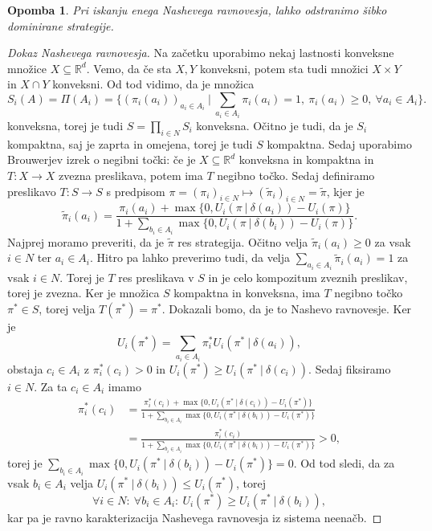 \documentclass[10pt, a4paper]{article}
\newtheorem*{opomba}{Opomba}
\newenvironment{noticeC}{%
  \tcolorbox[%
  notitle,
  empty,
  enhanced,  %
  breakable,
  coltext=black, 
  fontupper=\rmfamily,
  parbox=false,
  noparskip,
  sharp corners,
  boxrule=-1pt,  %
  frame hidden,
  left=7pt,  %
  right=7pt,
  top=5pt,
  bottom=5pt,
  before skip=2.5ex plus 2pt,
  after skip=2.5ex plus 2pt,
  overlay unbroken and last={%
  },
  ]}
{\endtcolorbox}
\newenvironment{dokaz}%
  {\begin{noticeC}\begin{proof}}%
  {\end{proof}\end{noticeC}}
\newcommand{\R}{\mathbb {R}}
\begin{document}
\begin{opomba}
  Pri iskanju enega Nashevega ravnovesja, lahko odstranimo šibko dominirane strategije.
\end{opomba}

\begin{dokaz}[Dokaz Nashevega ravnovesja]
  Na začetku uporabimo nekaj lastnosti konveksne množice $X \subseteq \R^d$.
  Vemo, da če sta $X, Y$ konveksni, potem sta tudi množici $X \times Y$ in $X \cap Y$ konveksni.
  Od tod vidimo, da je množica 
  $$S_i (A) = \Pi(A_i) = \{(\pi_i(a_i))_{a_i \in A_i}\ |\ \sum_{a_i \in A_i} \pi_i (a_i) = 1,\ \pi_i (a_i) \geq 0,\ \forall a_i \in A_i\}.$$
  konveksna, torej je tudi $S = \prod_{i \in N} S_i$ konveksna. 
  Očitno je tudi, da je $S_i$ kompaktna, saj je zaprta in omejena, torej je tudi $S$ kompaktna.
  Sedaj uporabimo Brouwerjev izrek o negibni točki: če je $X \subseteq \R^d$
  konveksna in kompaktna in $T: X \to X$ zvezna preslikava, 
  potem ima $T$ negibno točko.
  Sedaj definiramo preslikavo 
  $T: S \to S$ s predpisom 
  $\pi = (\pi_i)_{i \in N} \mapsto (\widetilde{\pi}_i)_{i\in N} = \widetilde{\pi}$,
  kjer je 
  $$\widetilde{\pi}_i (a_i) = \frac{\pi_i (a_i) + \max \{0, U_i (\pi\ |\ \delta(a_i)) - U_i (\pi)\}}{1 + \sum_{b_i \in A_i} \max \{0, U_i (\pi\ |\ \delta(b_i)) - U_i (\pi)\}}.$$
  Najprej moramo preveriti, da je $\widetilde{\pi}$ res strategija.
  Očitno velja $\widetilde{\pi}_i (a_i) \geq 0$ za vsak $i \in N$ ter $a_i \in A_i$.
  Hitro pa lahko preverimo tudi, da velja $\sum_{a_i \in A_i} \widetilde{\pi}_i (a_i) = 1$ za vsak $i \in N$.
  Torej je $T$ res preslikava v $S$ in je celo kompozitum zveznih preslikav, torej je zvezna.
  Ker je množica $S$ kompaktna in konveksna, ima $T$ negibno točko $\pi^* \in S$, torej velja 
  $T(\pi^*) = \pi^*$. Dokazali bomo, da je to Nashevo ravnovesje.
  Ker je 
  $$U_i (\pi^*) = \sum_{a_i \in A_i} \pi_i^* U_i (\pi^*\ |\ \delta(a_i)),$$
  obstaja $c_i \in A_i$ z $\pi_i^* (c_i) > 0$ in $U_i (\pi^*) \geq U_i (\pi^*\ |\ \delta(c_i))$.
  Sedaj fiksiramo $i \in N$. Za ta $c_i \in A_i$ imamo 
  \begin{align*}
    \pi_i ^* (c_i) &= \frac{\pi_i^* (c_i) + \max \{0, U_i (\pi^*\ |\ \delta(c_i)) - U_i (\pi^*)\}}{1 + \sum_{b_i \in A_i} \max \{0, U_i (\pi^*\ |\ \delta(b_i)) - U_i (\pi^*)\}}\\ 
    &= \frac{\pi_i^* (c_i)}{1 + \sum_{b_i \in A_i} \max \{0, U_i (\pi^*\ |\ \delta(b_i)) - U_i (\pi^*)\}} > 0,
  \end{align*}
  torej je $\sum_{b_i \in A_i} \max \{0, U_i (\pi^*\ |\ \delta(b_i)) - U_i (\pi^*)\} = 0.$
  Od tod sledi, da za vsak $b_i \in A_i$ velja $U_i (\pi^*\ |\ \delta(b_i)) \leq U_i (\pi^*)$, torej 
  $$\forall i \in N:\ \forall b_i \in A_i:\ U_i (\pi^*) \geq U_i(\pi^*\ |\ \delta(b_i)),$$
  kar pa je ravno karakterizacija Nashevega ravnovesja iz sistema neenačb.
\end{dokaz}
\end{document}
